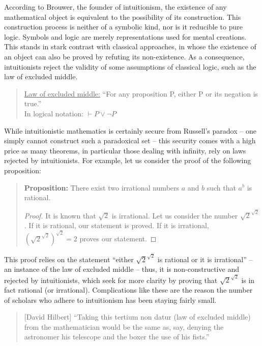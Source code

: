 \documentclass{article}
\begin{document}
According to Brouwer, the founder of intuitionism, the existence of any mathematical object is equivalent to the possibility of its construction. 
This construction process is neither of a symbolic kind, nor is it reducible to pure logic. Symbols and logic are merely representations used for mental creations.
This stands in stark contrast with classical approaches, in whose the existence of an object can also be proved by refuting its non-existence. As a consequence, intuitionists reject the validity of some assumptions of classical logic, such as the law of excluded middle.
\begin{quote}
\underline{Law of excluded middle:} ``For any proposition P, either P or its negation is true.''\\ 
In logical notation: $\vdash P\lor\lnot P$
\end{quote}
While intuitionistic mathematics is certainly secure from Russell's paradox -- one simply cannot construct such a paradoxical set -- this security comes with a high price as many theorems, in particular those dealing with infinity, rely on laws rejected by intuitionists. For example, let us consider the proof of the following proposition:
\begin{quote}
\textbf{Proposition:} There exist two irrational numbers $a$ and $b$ such that $a^b$ is rational.
\vspace{-2em}
\begin{proof}
	It is known that $\sqrt{2}$ is irrational. Let us consider the number $\sqrt{2}^{\sqrt{2}}$. If it is rational, our statement is proved. If it is irrational, $(\sqrt{2}^{\sqrt{2}})^{\sqrt{2}}=2$ proves our statement.
\end{proof}
\end{quote}
This proof relies on the statement ``either $\sqrt{2}^{\sqrt{2}}$ is rational or it is irrational'' -- an instance of the law of excluded middle -- thus, it is non-constructive and rejected by intuitionists, which seek for more clarity by proving that $\sqrt{2}^{\sqrt{2}}$ is in fact rational (or irrational). Complications like these are the reason the number of scholars who adhere to intuitionism has been staying fairly small.

\begin{quote}[David Hilbert]
``Taking this tertium non datur (law of excluded middle) from the mathematician would be the same as, say, denying the astronomer his telescope and the boxer the use of his fists.''\cite{hilbert_tertium_non_datur}
\end{quote}
\end{document}
